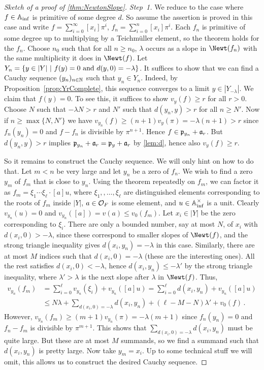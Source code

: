 \begin{proof}[Sketch of a proof of \cref{thm:NewtonSlope}]
	\emph{Step~1.} We reduce to the case where $f\in\mathbb{A}_{\mathrm{inf}}$ is primitive of some degree $d$. So assume the assertion is proved in this case and write $f=\sum_{i=0}^\infty [x_i]\pi^i$, $f_n=\sum_{i=0}^n[x_i]\pi^i$. Each $f_n$ is primitive of some degree up to multiplying by a Teichmüller element, so the theorem holds for the $f_n$. Choose $n_0$ such that for all $n\geq n_0$, $\lambda$ occurs as a slope in $\Newt(f_n)$ with the same multiplicity it does in $\Newt(f)$. Let $Y_n=\left\{y\in|Y|\ \middle|\  f(y)=0\text{ and }d(y,0)=-\lambda\right\}$. It suffices to show that we can find a Cauchy sequence $(y_n)_{n\in\mathbb{N}}$ such that $y_n\in Y_n$. Indeed, by Proposition~\cref{prop:YrComplete}, this sequence converges to a limit $y\in |Y_{-\lambda}|$. We claim that $f(y)=0$. To see this, it suffices to show $v_y(f)\geq r$ for all $r>0$. Choose $N$ such that $-\lambda N>r$ and $N'$ such that $d(y_n,y)>r$ for all $n\geq N'$. Now if $n\geq\max\{N,N'\}$ we have $v_{y_n}(f)\geq (n+1)v_y(\pi)=-\lambda(n+1)>r$ since $f_n(y_n)=0$ and $f-f_n$ is divisible by $\pi^{n+1}$. Hence $f\in\mathfrak{p}_{y_n}+\mathfrak{a}_r$. But $d(y_n,y)>r$ implies $\mathfrak{p}_{y_n}+\mathfrak{a}_r=\mathfrak{p}_y+\mathfrak{a}_r$ by \cref{lem:d}, hence also $v_y(f)\geq r$.
	
	So it remains to construct the Cauchy sequence. We will only hint on how to do that. Let $m<n$ be very large and let $y_n$ be a zero of $f_n$. We wish to find a zero $y_m$ of $f_m$ that is close to $y_n$. Using the theorem repeatedly on $f_m$, we can factor it as $f_m=\xi_1\dotsm\xi_\ell\cdot [a] u$, where $\xi_1,,\dots,\xi_\ell$ are distinguished elements corresponding to the roots of $f_m$ inside $|Y|$, $a\in\mathcal{O}_F$ is some element, and $u\in\mathbb{A}_{\mathrm{inf}}^\times$ is a unit. Clearly $v_{y_n}(u)=0$ and $v_{y_n}([a])=v(a)\leq v_0(f_m)$. Let $x_i\in|Y|$ be the zero corresponding to $\xi_i$. There are only a bounded number, say at most $N$, of $x_i$ with $d(x_i,0)>-\lambda$, since these correspond to smaller slopes of $\Newt(f)$, and the strong triangle inequality gives $d(x_i,y_n)=-\lambda$ in this case. Similarly, there are at most $M$ indices such that $d(x_i,0)=-\lambda$ (these are the interesting ones). All the rest satisfies $d(x_i,0)<-\lambda$, hence $d(x_i,y_n)\leq -\lambda'$ by the strong triangle inequality, where $\lambda'>\lambda$ is the next slope after $\lambda$ in $\Newt(f)$. Thus,
	\begin{align*}
		v_{y_n}(f_m)&=\sum_{i=0}^\ell v_{y_n}(\xi_i)+v_{y_n}([a]u)=\sum_{i=0}^\ell d(x_i,y_n)+v_{y_n}([a]u)\\
		&\leq N\lambda+\sum_{d(x_i,0)=-\lambda}d(x_i,y_n)+(\ell-M-N)\lambda'+v_0(f)\,.
	\end{align*}
	However, $v_{y_n}(f_m)\geq (m+1)v_{y_n}(\pi)=-\lambda(m+1)$ since $f_n(y_n)=0$ and $f_n-f_m$ is divisible by $\pi^{m+1}$. This shows that $\sum_{d(x_i,0)=-\lambda}d(x_i,y_n)$ must be quite large. But these are at most $M$ summands, so we find a summand such that $d(x_i,y_n)$ is pretty large. Now take $y_m=x_i$. Up to some technical stuff we will omit, this allows us to construct the desired Cauchy sequence.
	

\end{proof}

